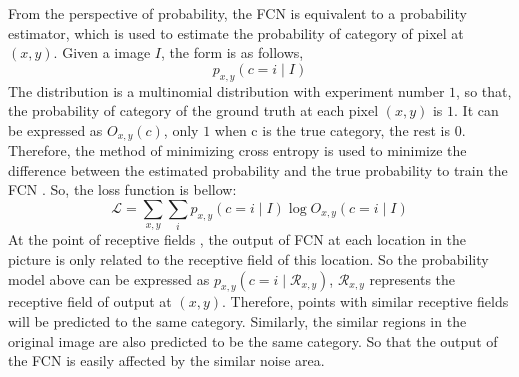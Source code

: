 From the perspective of probability, the FCN is equivalent to a probability estimator, which is used to estimate the probability of category of pixel at $(x,y)$. Given a image $I$, the form is as follows,
$$p_{x,y}(c=i \mid I)$$
The distribution is a multinomial distribution with experiment number $1$, so that, the probability of category of the ground truth at each pixel $(x,y)$ is $1$. It can be expressed as $O_{x,y}(c)$, only $1$ when c is the true category, the rest is 0. Therefore, the method of minimizing cross entropy is used to minimize the difference between the estimated probability and the true probability to train the FCN \cite{CNN:kingma2013auto}. So, the loss function is bellow:
$$\mathcal{L} = \sum_{x,y} \sum_{i}p_{x,y}(c=i\mid I)\log O_{x,y}(c=i\mid I)$$
At the point of receptive fields \cite{CNN:hubel1962receptive}, the output of FCN at each location in the picture is only related to the receptive field of this location. So the probability model above can be expressed as $p_{x,y}(c=i \mid \mathcal{R}_{x,y})$, $\mathcal{R}_{x,y}$ represents the receptive field of output at $(x,y)$. Therefore, points with similar receptive fields will be predicted to the same category. Similarly, the similar regions in the original image are also predicted to be the same category. So that the output of the FCN is easily affected by the similar noise area.
